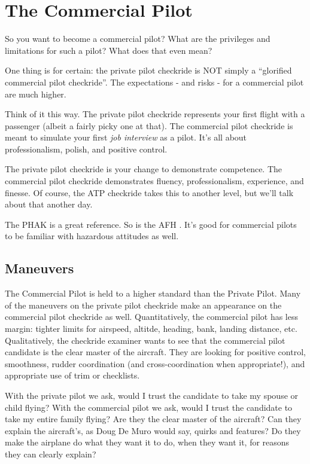 \chapter{The Commercial Pilot}

So you want to become a commercial pilot? What are the privileges and limitations for such a pilot? What does that even mean?

One thing is for certain: the private pilot checkride is NOT simply a ``glorified commercial pilot checkride''. The expectations - and risks - for a commercial pilot are much higher.

Think of it this way. The private pilot checkride represents your first flight with a passenger (albeit a fairly picky one at that). The commercial pilot checkride is meant to simulate your first \emph{job interview} as a pilot. It's all about professionalism, polish, and positive control.

The private pilot checkride is your change to demonstrate competence. The commercial pilot checkride demonstrates fluency, professionalism, experience, and finesse. Of course, the ATP checkride takes this to another level, but we'll talk about that another day.

The PHAK \cite{PHAK} is a great reference. So is the AFH \cite{AFH}. It's good for commercial pilots to be familiar with hazardous attitudes \cite{adm} as well.

\section{Maneuvers}

The Commercial Pilot is held to a higher standard than the Private Pilot. Many of the maneuvers on the private pilot checkride make an appearance on the commercial pilot checkride as well. Quantitatively, the commercial pilot has less margin: tighter limits for airspeed, altitde, heading, bank, landing distance, etc. Qualitatively, the checkride examiner wants to see that the commercial pilot candidate is the clear master of the aircraft. They are looking for positive control, smoothness, rudder coordination (and cross-coordination when appropriate!), and appropriate use of trim or checklists.

With the private pilot we ask, would I trust the candidate to take my spouse or child flying? With the commercial pilot we ask, would I trust the candidate to take my entire family flying? Are they the clear master of the aircraft? Can they explain the aircraft's, as Doug De Muro would say, quirks and features? Do they make the airplane do what they want it to do, when they want it, for reasons they can clearly explain?

